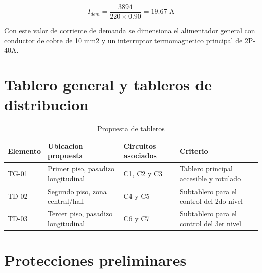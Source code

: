 \begin{equation}
I_{dem} = \frac{3894}{220 \times 0.90} = 19.67\text{ A}
\end{equation}

Con este valor de corriente de demanda se dimensiona el alimentador general con conductor de cobre de 10 mm2 y un interruptor termomagnetico principal de 2P-40A.

\section{Tablero general y tableros de distribucion}

\begin{table}[H]
\centering
\small
\caption{Propuesta de tableros}
\label{tab:tableros-distribucion}
\begin{tabularx}{\textwidth}{L{1.8cm}L{4.0cm}L{4.2cm}Y}
\toprule
\textbf{Elemento} & \textbf{Ubicacion propuesta} & \textbf{Circuitos asociados} & \textbf{Criterio} \\
\midrule
TG-01 & Primer piso, pasadizo longitudinal & C1, C2 y C3 & Tablero principal accesible y rotulado \\
TD-02 & Segundo piso, zona central/hall & C4 y C5 & Subtablero para el control del 2do nivel \\
TD-03 & Tercer piso, pasadizo longitudinal & C6 y C7 & Subtablero para el control del 3er nivel \\
\bottomrule
\end{tabularx}
\end{table}

\section{Protecciones preliminares}

